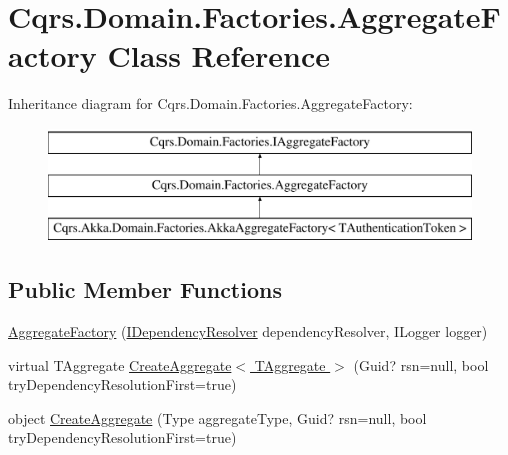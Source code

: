 \hypertarget{classCqrs_1_1Domain_1_1Factories_1_1AggregateFactory}{}\section{Cqrs.\+Domain.\+Factories.\+Aggregate\+Factory Class Reference}
\label{classCqrs_1_1Domain_1_1Factories_1_1AggregateFactory}
Inheritance diagram for Cqrs.\+Domain.\+Factories.\+Aggregate\+Factory\+:\begin{figure}[H]
\begin{center}
\leavevmode
\includegraphics[height=3.000000cm]{classCqrs_1_1Domain_1_1Factories_1_1AggregateFactory}
\end{center}
\end{figure}
\subsection*{Public Member Functions}
\begin{DoxyCompactItemize}
\item 
\hyperlink{classCqrs_1_1Domain_1_1Factories_1_1AggregateFactory_a8731bed6c8a8594c17bf0d32ff83939a_a8731bed6c8a8594c17bf0d32ff83939a}{Aggregate\+Factory} (\hyperlink{interfaceCqrs_1_1Configuration_1_1IDependencyResolver}{I\+Dependency\+Resolver} dependency\+Resolver, I\+Logger logger)
\item 
virtual T\+Aggregate \hyperlink{classCqrs_1_1Domain_1_1Factories_1_1AggregateFactory_aa13b39399abe7db18005573c28ab3d2a_aa13b39399abe7db18005573c28ab3d2a}{Create\+Aggregate$<$ T\+Aggregate $>$} (Guid? rsn=null, bool try\+Dependency\+Resolution\+First=true)
\item 
object \hyperlink{classCqrs_1_1Domain_1_1Factories_1_1AggregateFactory_aa60839e14ef01b3971067e1f154ee6b4_aa60839e14ef01b3971067e1f154ee6b4}{Create\+Aggregate} (Type aggregate\+Type, Guid? rsn=null, bool try\+Dependency\+Resolution\+First=true)
\end{DoxyCompactItemize}
